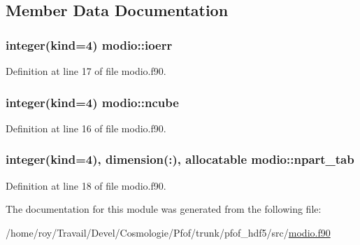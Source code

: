 \subsection{Member Data Documentation}
\hypertarget{classmodio_a62b213d7b9f52071f903b877ee52c86b}{
\subsubsection[{ioerr}]{\setlength{\rightskip}{0pt plus 5cm}integer(kind=4) modio\-::ioerr}}\label{classmodio_a62b213d7b9f52071f903b877ee52c86b}


Definition at line 17 of file modio.\-f90.

\hypertarget{classmodio_af7ac0e60c49f16bf08605237dd728508}{
\subsubsection[{ncube}]{\setlength{\rightskip}{0pt plus 5cm}integer(kind=4) modio\-::ncube}}\label{classmodio_af7ac0e60c49f16bf08605237dd728508}


Definition at line 16 of file modio.\-f90.

\hypertarget{classmodio_a0bb05c9005df17b314c2a7e0f43e758c}{
\subsubsection[{npart\-\_\-tab}]{\setlength{\rightskip}{0pt plus 5cm}integer(kind=4), dimension(\-:), allocatable modio\-::npart\-\_\-tab}}\label{classmodio_a0bb05c9005df17b314c2a7e0f43e758c}


Definition at line 18 of file modio.\-f90.



The documentation for this module was generated from the following file\-:\begin{DoxyCompactItemize}
\item 
/home/roy/\-Travail/\-Devel/\-Cosmologie/\-Pfof/trunk/pfof\-\_\-hdf5/src/\hyperlink{pfof__hdf5_2src_2modio_8f90}{modio.\-f90}\end{DoxyCompactItemize}
